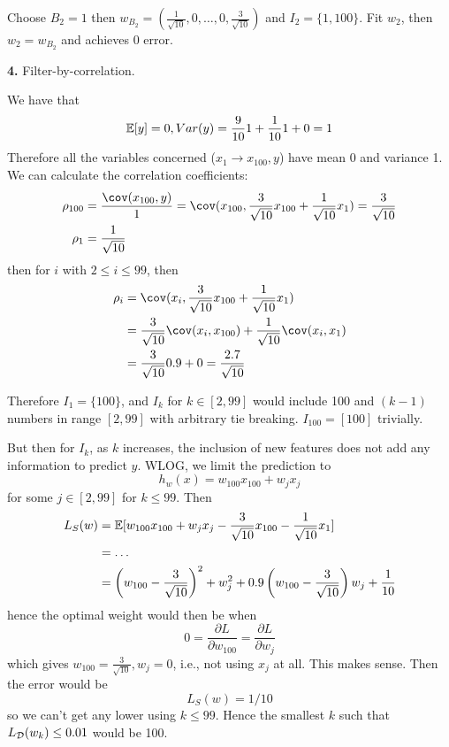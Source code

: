 \documentclass[a4paper, 10pt]{article}
\begin{document}
\begin{problem} [Problem 1]
    Choose $B_2 = 1$ then $w_{B_2} = (\frac{1}{\sqrt{10}}, 0, \ldots, 0, \frac{3}{\sqrt{10}})$ and $I_2 = \{1, 100\}$. Fit $w_2$, then $w_2 = w_{B_2}$ and achieves 0 error.

    \textbf{4.} Filter-by-correlation.

    We have that \begin{equation*}
    \mathbb{E}[y] = 0, Var(y) = \frac{9}{10} 1 + \frac{1}{10} 1 + 0 = 1
    \end{equation*}
    Therefore all the variables concerned ($x_1 \to x_{100}, y$) have mean 0 and variance 1. We can calculate the correlation coefficients:
    \begin{align*}
    \rho_{100} &= \frac{\cov(x_{100}, y)}{1} = \cov(x_{100}, \frac{3}{\sqrt{10}}x_{100} + \frac{1}{\sqrt{10}} x_1) = \frac{3}{\sqrt{10}} \\
    \rho_1 &= \frac{1}{\sqrt{10}}
    \end{align*}
    then for $i$ with $2 \leq i \leq 99$, then \begin{align*}
    \rho_{i} &= \cov(x_i, \frac{3}{\sqrt{10}}x_{100} + \frac{1}{\sqrt{10}} x_1) \\ 
    &= \frac{3}{\sqrt{10}} \cov(x_i, x_{100}) + \frac{1}{\sqrt{10}} \cov(x_i, x_1) \\
    &= \frac{3}{\sqrt{10}} 0.9 + 0 = \frac{2.7}{\sqrt{10}}
    \end{align*}

    Therefore $I_1 = \{100\}$, and $I_k$ for $k \in [2, 99]$ would include 100 and $(k-1)$ numbers in range $[2, 99]$ with arbitrary tie breaking. $I_{100} = [100]$ trivially.

    But then for $I_k$, as $k$ increases, the inclusion of new features does not add any information to predict $y$. WLOG, we limit the prediction to \begin{equation*}
    h_w(x) = w_{100} x_{100} + w_j x_j
    \end{equation*}
    for some $j \in [2, 99]$ for $k \leq 99$. Then \begin{align*}
    L_S(w) &= \mathbb{E}[w_{100} x_{100} + w_j x_j - \frac{3}{\sqrt{10}} x_{100} - \frac{1}{\sqrt{10}} x_1] \\
    &= \ldots \\
    &= \left(w_{100} - \frac{3}{\sqrt{10}}\right)^2 + w_j^2 + 0.9 \left(w_{100} - \frac{3}{\sqrt{10}}\right)w_j + \frac{1}{10}
    \end{align*}
    hence the optimal weight would then be when \begin{equation*}
    0 = \frac{\partial L}{\partial w_{100}} = \frac{\partial L}{\partial w_j}
    \end{equation*}
    which gives $w_{100} = \frac{3}{\sqrt{10}}, w_j = 0$, i.e., not using $x_j$ at all. This makes sense. Then the error would be \begin{equation*}
    L_S(w) = 1/10
    \end{equation*}
    so we can't get any lower using $k \leq 99$. Hence the smallest $k$ such that $L_{\mathcal{D}}(w_k) \leq 0.01$ would be 100.


\end{problem}
\end{document}
